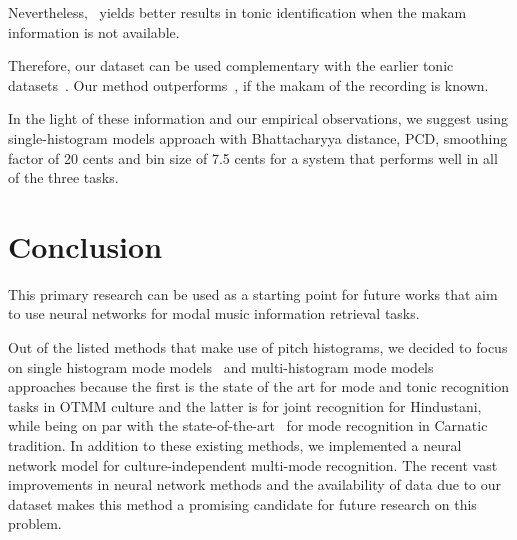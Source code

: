 \documentclass{sig-alternate}
\begin{document}
Nevertheless,~\cite{sercan_tonic} yields better results in tonic identification when the makam information is not available.

Therefore, our dataset can be used complementary with the earlier tonic datasets~\cite{senturk2013karar_ismir, atli2014makamFeature_atmm}. Our method outperforms~\cite{sercan_tonic}, if the makam of the recording is known. 

In the light of these information and our empirical observations, we suggest using single-histogram models approach with Bhattacharyya distance, PCD, smoothing factor of 20 cents and bin size of 7.5 cents for a system that performs well in all of the three tasks. 


\section{Conclusion}\label{sec:conclusion}

This primary research can be used as a starting point for future works that aim to use neural networks for modal music information retrieval tasks. 

Out of the listed methods that make use of pitch histograms, we decided to focus on single histogram mode models~\cite{bozkurt_makam,bozkurt_tonic} and multi-histogram mode models~\cite{chordia} approaches because the first is the state of the art for mode and tonic recognition tasks in OTMM culture and the latter is for joint recognition for Hindustani, while being on par with the state-of-the-art~\cite{gulati_network} for mode recognition in Carnatic tradition. In addition to these existing methods, we implemented a neural network model for culture-independent multi-mode recognition. The recent vast improvements in neural network methods and the availability of data due to our dataset makes this method a promising candidate for future research on this problem. 




\end{document}
